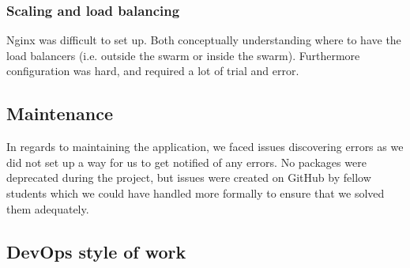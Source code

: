 \subsubsection{Scaling and load balancing}
Nginx was difficult to set up. Both conceptually understanding where to have the load balancers (i.e. outside the swarm or inside the swarm).
Furthermore configuration was hard, and required a lot of trial and error.\\


\subsection{Maintenance}
In regards to maintaining the application, we faced issues discovering errors as we did not set up a way for us to get
notified of any errors. No packages were deprecated during the project, but issues were created on GitHub by 
fellow students which we could have handled more formally to ensure that we solved them adequately.

\subsection{DevOps style of work}